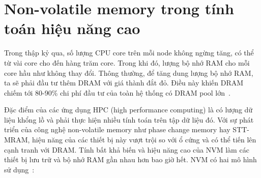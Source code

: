 \clearpage
\section{Non-volatile memory trong tính toán hiệu năng cao}




Trong thập kỷ qua, số lượng CPU core trên mỗi node không ngừng tăng, có thể từ
vài core cho đến hàng trăm core. Trong khi đó, lượng bộ nhớ RAM cho mỗi core hầu
như không thay đổi. Thông thường, để tăng dung lượng bộ nhớ RAM, ta sẽ phải đầu
tư thêm DRAM với giá thành đắt đỏ. Điều này khiến DRAM chiếm tới 80-90\% chi phí
đầu tư của toàn hệ thống có DRAM pool
lớn~\cite{mironovPerformanceEvaluationIntel2019}.

Đặc điểm của các ứng dụng HPC (high performance computing) là có lượng dữ liệu
khổng lồ và phải thực hiện nhiều tính toán trên tập dữ liệu đó. Với sự phát
triển của công nghệ non-volatile memory như phase change memory hay STT-MRAM,
hiệu năng của các thiết bị này vượt trội so với ổ cứng và có thể tiến lên cạnh
tranh với DRAM. Tính bất khả biến và hiệu năng cao của NVM làm các thiết bị lưu
trữ và bộ nhớ RAM gần nhau hơn bao giờ hết. NVM có hai mô hình sử
dụng~\cite{liuPerformanceEvaluationModeling2017}:

